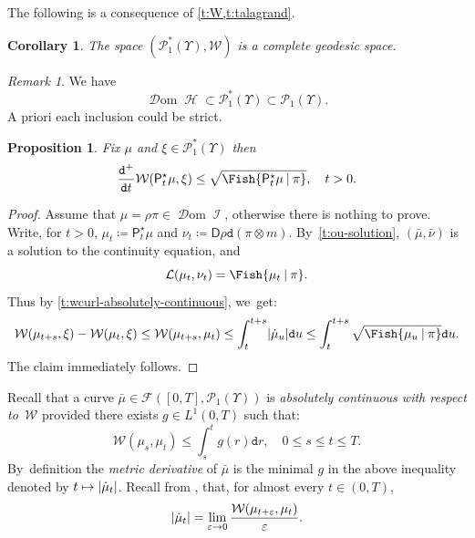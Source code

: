 \documentclass[10pt]{amsart}
\newcommand\mto{\mathchoice{\longmapsto}{\mapsto}{\mapsto}{\mapsto}}
\newtheorem{proposition}[theorem]{Proposition}
\newtheorem{corollary}[theorem]{Corollary}
\theoremstyle{definition}
\theoremstyle{remark}
\newtheorem{remark}[theorem]{Remark}
\DeclarePairedDelimiter{\abs}{\lvert}{\rvert}
\newcommand{\given}[1][]{%
\nonscript\:#1\vert
\allowbreak
\nonscript\:
\mathopen{}}
\DeclareMathOperator{\ent}{\mathcal{H}}
\DeclareMathOperator{\fish}{\mathcal{I}}
\DeclareMathOperator{\dom}{\mathscr{D}om}
\begin{document}
The following is a consequence of \cref{t:W,t:talagrand}.
\begin{corollary}\label{t:p1-complete-geodesic}
The space $(\mathscr{P}_{1}^{*}(\varUpsilon), \mathcal{W})$ is a complete geodesic space.
\end{corollary}

\begin{remark}
We have
\begin{equation*}
\dom \ent \subset \mathscr{P}_{1}^{*}(\varUpsilon) \subset \mathscr{P}_{1}(\varUpsilon).
\end{equation*}
A priori each inclusion could be strict.
\end{remark}

\begin{proposition}\label{t:wcurl-derivative-fisher}
Fix $\mu$ and $\xi \in \mathscr{P}^{*}_{1}(\varUpsilon)$ then
\begin{equation*}
\frac{\mathtt{d}^{+}}{\mathtt{d} t} \mathcal{W}(\mathsf{P}^{\star}_{t}\mu, \xi) \leq \sqrt{\Fish{ \mathsf{P}^{\star}_{t} \mu \given \pi }}, \quad t > 0.
\end{equation*}
\end{proposition}
\begin{proof}
Assume that $\mu = \rho \pi \in \dom \fish$, otherwise there is nothing to prove.
Write, for $t > 0$, $\mu_{t} \coloneq \mathsf{P}^{\star}_{t} \mu$ and $\nu_{t} \coloneq \mathsf{D} \rho \mathtt{d}(\pi \otimes m)$.
By~\cref{t:ou-solution}, $(\bar{\mu}, \bar{\nu})$ is a solution to the continuity equation, and
\begin{equation*}
\mathcal{L}(\mu_{t}, \nu_{t}) = \Fish{ \mu_{t} \given \pi }.
\end{equation*}
Thus by \cref{t:wcurl-absolutely-continuous}, we~get:
\begin{equation*}
\mathcal{W}(\mu_{t+s}, \xi) - \mathcal{W}(\mu_{t}, \xi) \leq \mathcal{W}(\mu_{t+s}, \mu_{t}) \leq \int_{t}^{t+s} \abs{\dot{\mu}_{u}} \mathtt{d} u \leq \int_{t}^{t+s} \sqrt{\Fish{ \mu_{u} \given \pi }} \mathtt{d} u.
\end{equation*}
The claim immediately follows.
\end{proof}

Recall that a curve $\bar{\mu} \in \mathscr{F}([0,T], \mathscr{P}_{1}(\varUpsilon))$ is \emph{absolutely continuous with respect to~$\mathcal{W}$} provided there exists $g \in L^{1}(0,T)$ such that:
\begin{equation*}
\mathcal{W}(\mu_{s}, \mu_{t}) \leq \int_{s}^{t} g(r) \mathtt{d} r, \quad 0 \leq s \leq t \leq T.
\end{equation*}
By~definition the \emph{metric derivative} of $\bar{\mu}$ is the minimal $g$ in the above inequality denoted by $t \mto \abs{\dot{\mu}_{t}}$.
Recall from \cite[Th.\,1.1.2]{AGS}, that, for almost every $t \in (0,T)$,
\begin{equation*}
\abs{\dot{\mu}_{t}} = \lim_{\varepsilon \to 0} \frac{\mathcal{W}(\mu_{t + \varepsilon}, \mu_{t})}{\varepsilon}.
\end{equation*}
\end{document}
